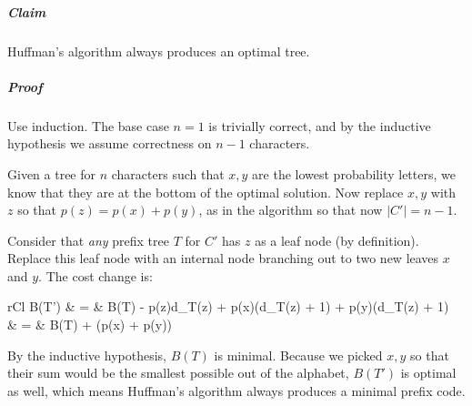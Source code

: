 \documentclass[11pt]{article}
\begin{document}
	\subparagraph{Claim} Huffman's algorithm always produces an optimal tree.
	
	\subparagraph{Proof} Use induction. The base case $n=1$ is trivially correct, and by the inductive hypothesis we assume correctness on $n-1$ characters.
	
	Given a tree for $n$ characters such that $x, y$ are the lowest probability letters, we know that they are at the bottom of the optimal solution. Now replace $x, y$ with $z$ so that $p(z) = p(x) + p(y)$, as in the algorithm so that now $|C'| = n - 1$.
	
	Consider that \textit{any} prefix tree $T$ for $C'$ has $z$ as a leaf node (by definition). Replace this leaf node with an internal node branching out to two new leaves $x$ and $y$. The cost change is:
	
	\begin{IEEEeqnarray}{rCl}
		B(T') & = & B(T) - p(z)d_T(z) + p(x)(d_T(z) + 1) + p(y)(d_T(z) + 1)\\
		& = & B(T) + (p(x) + p(y))
	\end{IEEEeqnarray}
	
	By the inductive hypothesis, $B(T)$ is minimal. Because we picked $x, y$ so that their sum would be the smallest possible out of the alphabet, $B(T')$ is optimal as well, which means Huffman's algorithm always produces a minimal prefix code.
%		
%		


\end{document}
